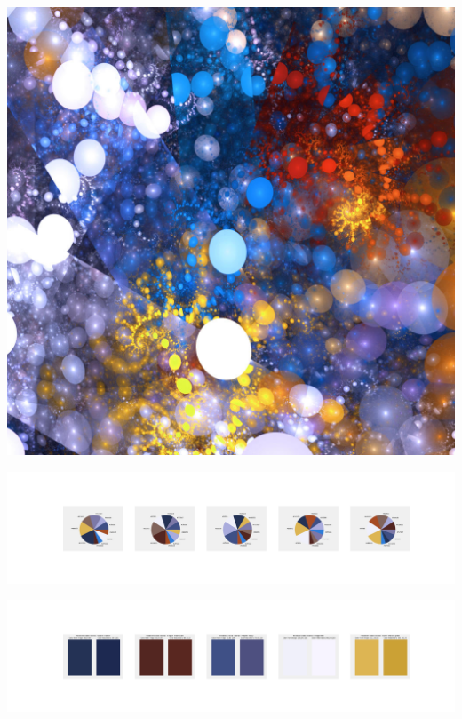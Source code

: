 \documentclass[11pt]{article}
\begin{document}
\begin{landscape}
    \begin{center}
    \includegraphics[width=\textwidth]{./nbimg/file (185).jpg}
    \end{center}

    \begin{center}
    \includegraphics[width=250mm]{./nbimg/pie-95.jpg}
    \end{center}

    \begin{center}
    \includegraphics[width=250mm]{./nbimg/peak-95.jpg}
    \end{center}
    


\end{landscape}
\end{document}
